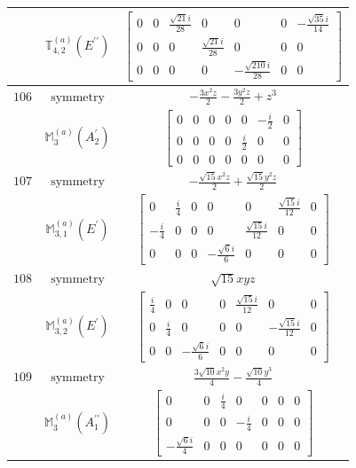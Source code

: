 \documentclass[fleqn,8pt,landscape]{jsarticle}
\begin{document}
\begin{longtable}{ccc}
$  $ & $ \mathbb{T}_{4,2}^{(a)}(E^{\prime\prime}) $ & $ \begin{bmatrix} 0 & 0 & \frac{\sqrt{21} i}{28} & 0 & 0 & 0 & - \frac{\sqrt{35} i}{14} \\ 0 & 0 & 0 & \frac{\sqrt{21} i}{28} & 0 & 0 & 0 \\ 0 & 0 & 0 & 0 & - \frac{\sqrt{210} i}{28} & 0 & 0 \end{bmatrix} $ \\ \hline
$ 106 $ & $ \text{symmetry} $ & $ - \frac{3 x^{2} z}{2} - \frac{3 y^{2} z}{2} + z^{3} $ \\
$  $ & $ \mathbb{M}_{3}^{(a)}(A_{2}^{\prime}) $ & $ \begin{bmatrix} 0 & 0 & 0 & 0 & 0 & - \frac{i}{2} & 0 \\ 0 & 0 & 0 & 0 & \frac{i}{2} & 0 & 0 \\ 0 & 0 & 0 & 0 & 0 & 0 & 0 \end{bmatrix} $ \\ \hline
$ 107 $ & $ \text{symmetry} $ & $ - \frac{\sqrt{15} x^{2} z}{2} + \frac{\sqrt{15} y^{2} z}{2} $ \\
$  $ & $ \mathbb{M}_{3,1}^{(a)}(E^{\prime}) $ & $ \begin{bmatrix} 0 & \frac{i}{4} & 0 & 0 & 0 & \frac{\sqrt{15} i}{12} & 0 \\ - \frac{i}{4} & 0 & 0 & 0 & \frac{\sqrt{15} i}{12} & 0 & 0 \\ 0 & 0 & 0 & - \frac{\sqrt{6} i}{6} & 0 & 0 & 0 \end{bmatrix} $ \\ \hline
$ 108 $ & $ \text{symmetry} $ & $ \sqrt{15} x y z $ \\
$  $ & $ \mathbb{M}_{3,2}^{(a)}(E^{\prime}) $ & $ \begin{bmatrix} \frac{i}{4} & 0 & 0 & 0 & \frac{\sqrt{15} i}{12} & 0 & 0 \\ 0 & \frac{i}{4} & 0 & 0 & 0 & - \frac{\sqrt{15} i}{12} & 0 \\ 0 & 0 & - \frac{\sqrt{6} i}{6} & 0 & 0 & 0 & 0 \end{bmatrix} $ \\ \hline
$ 109 $ & $ \text{symmetry} $ & $ \frac{3 \sqrt{10} x^{2} y}{4} - \frac{\sqrt{10} y^{3}}{4} $ \\
$  $ & $ \mathbb{M}_{3}^{(a)}(A_{1}^{\prime\prime}) $ & $ \begin{bmatrix} 0 & 0 & \frac{i}{4} & 0 & 0 & 0 & 0 \\ 0 & 0 & 0 & - \frac{i}{4} & 0 & 0 & 0 \\ - \frac{\sqrt{6} i}{4} & 0 & 0 & 0 & 0 & 0 & 0 \end{bmatrix} $ \\ \hline

\end{longtable}
\end{document}

